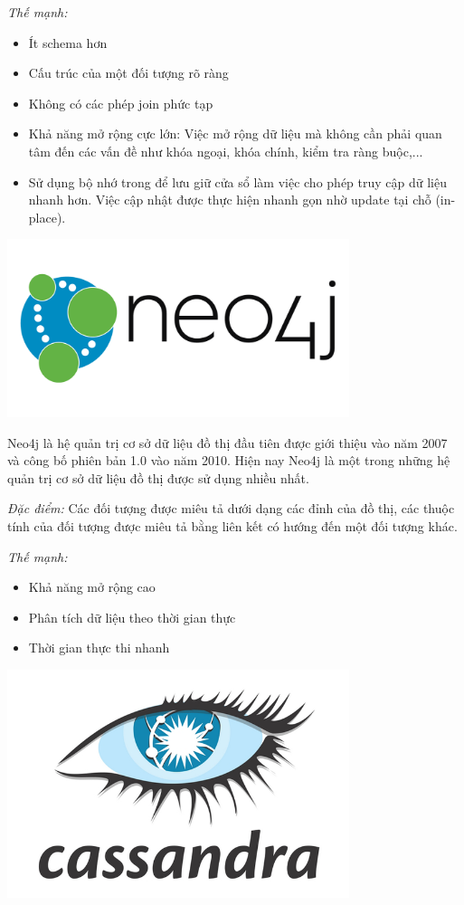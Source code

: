 \textit{Thế mạnh:}
\begin{itemize}
    \item Ít schema hơn
    \item Cấu trúc của một đối tượng rõ ràng
    \item Không có các phép join phức tạp
    \item Khả năng mở rộng cực lớn: Việc mở rộng dữ liệu mà không cần phải quan tâm đến các vấn đề như khóa ngoại, khóa chính, kiểm tra ràng buộc,...
    \item Sử dụng bộ nhớ trong để lưu giữ cửa sổ làm việc cho phép truy cập dữ liệu nhanh hơn. Việc cập nhật được thực hiện nhanh gọn nhờ update tại chỗ (in-place).
\end{itemize}
\begin{center}
  \captionsetup{type=figure}
  \includegraphics[width=10cm]{img/neo4j.png}
\end{center}

Neo4j là hệ quản trị cơ sở dữ liệu đồ thị đầu tiên được giới thiệu vào năm 2007 và công bố phiên bản 1.0 vào năm 2010. Hiện nay Neo4j là một trong những hệ quản trị cơ sở dữ liệu đồ thị được sử dụng nhiều nhất.

\textit{Đặc điểm:} Các đối tượng được miêu tả dưới dạng các đỉnh của đồ thị, các thuộc tính của đối tượng được miêu tả bằng liên kết có hướng đến một đối tượng khác.

\textit{Thế mạnh:}
\begin{itemize}
    \item Khả năng mở rộng cao
    \item Phân tích dữ liệu theo thời gian thực
    \item Thời gian thực thi nhanh
\end{itemize}
\begin{center}
  \captionsetup{type=figure}
  \includegraphics[width=10cm]{img/cassandra.png}
\end{center}

